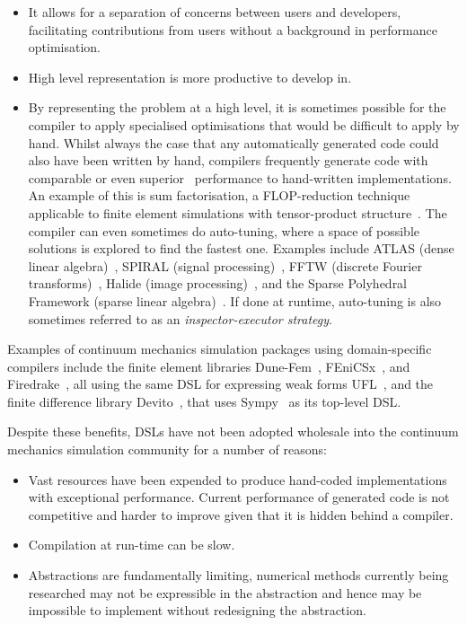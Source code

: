 \documentclass[thesis]{subfiles}
\begin{document}
\begin{itemize}
  \item
    It allows for a separation of concerns between users and developers, facilitating contributions from users without a background in performance optimisation.
  \item
    High level representation is more productive to develop in.
  \item
    By representing the problem at a high level, it is sometimes possible for the compiler to apply specialised optimisations that would be difficult to apply by hand.
    Whilst always the case that any automatically generated code could also have been written by hand, compilers frequently generate code with comparable or even superior~\cite{ragan-kelleyHalideLanguageCompiler} performance to hand-written implementations.
    An example of this is sum factorisation, a FLOP-reduction technique applicable to finite element simulations with tensor-product structure~\cite{homolyaExposingExploitingStructure2017}.
    The compiler can even sometimes do auto-tuning, where a space of possible solutions is explored to find the fastest one.
    Examples include ATLAS (dense linear algebra)~\cite{whaleyAutomatedEmpiricalOptimizations2001}, SPIRAL (signal processing)~\cite{puschelSPIRALCodeGeneration2005}, FFTW (discrete Fourier transforms)~\cite{frigoDesignImplementationFFTW32005}, Halide (image processing)~\cite{ragan-kelleyHalideLanguageCompiler}, and the Sparse Polyhedral Framework (sparse linear algebra)~\cite{stroutSparsePolyhedralFramework2018}.
    If done at runtime, auto-tuning is also sometimes referred to as an \textit{inspector-executor strategy}.
\end{itemize}

Examples of continuum mechanics simulation packages using domain-specific compilers include the finite element libraries Dune-Fem~\cite{dednerGenericInterfaceParallel2010}, FEniCSx~\cite{barattaDOLFINxNextGeneration2023}, and Firedrake~\cite{FiredrakeUserManual}, all using the same DSL for expressing weak forms UFL~\cite{alnaesUnifiedFormLanguage2014a}, and the finite difference library Devito~\cite{devito-api,luporiniArchitecturePerformanceDevito2020}, that uses Sympy~\cite{10.7717/peerj-cs.103} as its top-level DSL.

Despite these benefits, DSLs have not been adopted wholesale into the continuum mechanics simulation community for a number of reasons:

\begin{itemize}
  \item
    Vast resources have been expended to produce hand-coded implementations with exceptional performance.
    Current performance of generated code is not competitive and harder to improve given that it is hidden behind a compiler.
  \item
    Compilation at run-time can be slow.
  \item
    Abstractions are fundamentally limiting, numerical methods currently being researched may not be expressible in the abstraction and hence may be impossible to implement without redesigning the abstraction.
\end{itemize}
\end{document}
